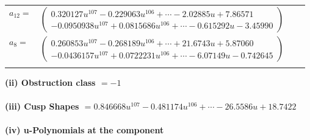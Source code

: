 \documentclass[1p]{elsarticle_modified}
\theoremstyle{definition}
\begin{document}
\begin{tabular}{m{7pt} m{180pt} m{7pt} m{180pt} }
\flushright $a_{12}=$&$\begin{pmatrix}0.320127 u^{107}-0.229063 u^{106}+\cdots-2.02885 u+7.86571\\-0.0950938 u^{107}+0.0815686 u^{106}+\cdots-0.615292 u-3.45990\end{pmatrix}$ \\
\flushright $a_{8}=$&$\begin{pmatrix}0.260853 u^{107}-0.268189 u^{106}+\cdots+21.6743 u+5.87060\\-0.0436157 u^{107}+0.0722231 u^{106}+\cdots-6.07149 u-0.742645\end{pmatrix}$\\&\end{tabular}
\flushleft \textbf{(ii) Obstruction class $= -1$}\\~\\
\flushleft \textbf{(iii) Cusp Shapes $= 0.846668 u^{107}-0.481174 u^{106}+\cdots-26.5586 u+18.7422$}\\~\\
\newpage\renewcommand{\arraystretch}{1}
\flushleft \textbf{(iv) u-Polynomials at the component}\newline \\
\end{document}

